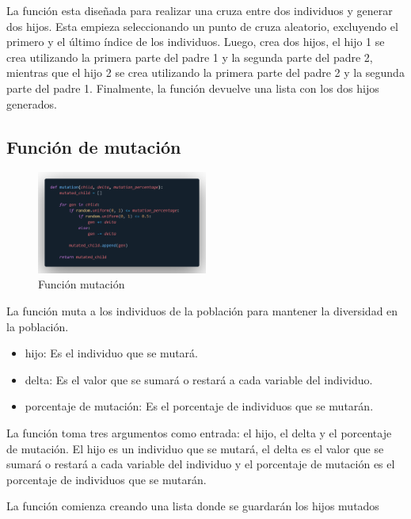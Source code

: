 \documentclass{report}
\begin{document}
    La función esta diseñada para realizar una cruza entre dos individuos y generar dos hijos. 
    Esta empieza seleccionando un punto de cruza aleatorio, excluyendo el primero y el último índice de los individuos.
    Luego, crea dos hijos, el hijo 1 se crea utilizando la primera parte del padre 1 y la segunda parte del padre 2, 
    mientras que el hijo 2 se crea utilizando la primera parte del padre 2 y la segunda parte del padre 1.
    Finalmente, la función devuelve una lista con los dos hijos generados.

    \subsection*{Función de mutación}
    \begin{figure}[h]
        \centering
        \includegraphics[width=0.5\textwidth]{funcionMutacion.png}
        \caption{Función mutación}
    \end{figure}

    La función muta a los individuos de la población para mantener la diversidad en la población.

    \begin{itemize}
        \item hijo: Es el individuo que se mutará.
        \item delta: Es el valor que se sumará o restará a cada variable del individuo.
        \item porcentaje de mutación: Es el porcentaje de individuos que se mutarán.
    \end{itemize}

    La función toma tres argumentos como entrada: el hijo, el delta y el porcentaje de mutación.
    El hijo es un individuo que se mutará, el delta es el valor que se sumará o restará a cada variable del individuo 
    y el porcentaje de mutación es el porcentaje de individuos que se mutarán.

    La función comienza creando una lista donde se guardarán los hijos mutados 
\end{document}
